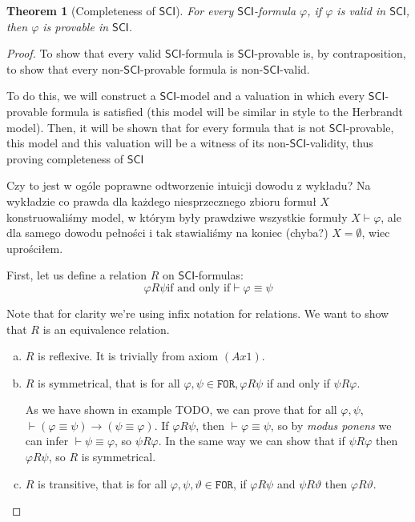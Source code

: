 \documentclass{article}
\newtheorem{theorem}{Theorem}
\theoremstyle{definition}
\newcommand*{\id}{\equiv}
\newcommand*{\ra}{\rightarrow}
\newcommand*{\FOR}{\texttt{FOR}}
\newcommand{\SCI}{$\mathsf{SCI}$\xspace}
\begin{document}
\begin{theorem}[Completeness of \SCI]
    For every \SCI-formula $\varphi$, if $\varphi$ is valid in \SCI, then $\varphi$ is provable in \SCI.
\end{theorem}
\begin{proof}
    To show that every valid \SCI-formula is \SCI-provable is, by contraposition, to show that every non-\SCI-provable formula is non-\SCI-valid.

    To do this, we will construct a \SCI-model and a valuation in which every
    \SCI-provable formula is satisfied (this model will be similar in style to the
    Herbrandt model). Then, it will be shown that for every formula that is not
    \SCI-provable, this model and this valuation will be a witness of its
    non-\SCI-validity, thus proving completeness of \SCI

    {\color{red}Czy to jest w ogóle poprawne odtworzenie intuicji dowodu z wykładu? Na wykładzie co prawda dla każdego niesprzecznego zbioru formuł $X$ konstruowaliśmy model, w którym były prawdziwe wszystkie formuły $X \vdash \varphi$, ale dla samego dowodu pełności i tak stawialiśmy na koniec (chyba?) $X = \emptyset$, wiec uprościłem.}

    First, let us define a relation $R$ on \SCI-formulas: $$ \varphi R \psi \text{
            if and only if} \vdash \varphi \id \psi $$

    Note that for clarity we're using infix notation for relations. We want to show
    that $R$ is an equivalence relation.
    \begin{enumerate}[(a)]
        \item $R$ is reflexive. It is trivially from axiom $(Ax1)$.
        \item $R$ is symmetrical, that is for all $\varphi, \psi \in \FOR, \varphi R \psi$ if and only if $\psi R \varphi$.

              As we have shown in example TODO, we can prove that for all $\varphi, \psi$,
              $\vdash (\varphi \id \psi) \ra (\psi \id \varphi)$. If $\varphi R \psi$, then
              $\vdash \varphi \id \psi$, so by \emph{modus ponens} we can infer $\vdash \psi
                  \id \varphi$, so $\psi R \varphi$. In the same way we can show that if $\psi R
                  \varphi$ then $\varphi R \psi$, so $R$ is symmetrical.
        \item $R$ is transitive, that is for all $\varphi, \psi, \vartheta \in \FOR$, if $\varphi R \psi$ and $\psi R \vartheta$ then $\varphi R \vartheta$.


\end{enumerate}
\end{proof}
\end{document}
